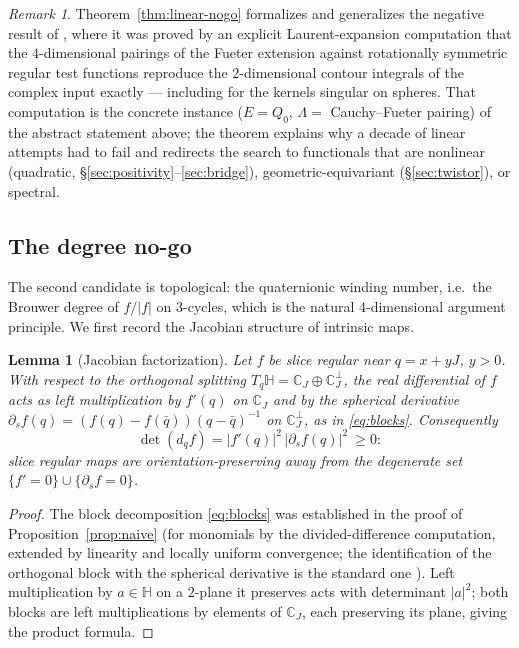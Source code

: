 \documentclass[11pt]{amsart}
\theoremstyle{plain}
\newtheorem{lemma}[theorem]{Lemma}
\theoremstyle{definition}
\theoremstyle{remark}
\newtheorem{remark}[theorem]{Remark}
\newcommand{\HH}{\mathbb{H}}
\newcommand{\CC}{\mathbb{C}}
\begin{document}
\begin{remark}\label{rem:nogo-history}
Theorem~\ref{thm:linear-nogo} formalizes and generalizes the negative result of
\cite[\S4]{Baker2015}, where it was proved by an explicit Laurent-expansion computation that the
$4$-dimensional pairings of the Fueter extension against rotationally symmetric regular test
functions reproduce the $2$-dimensional contour integrals of the complex input exactly ---
including for the kernels singular on spheres. That computation is the concrete instance
($E=Q_0$, $\Lambda=$ Cauchy--Fueter pairing) of the abstract statement above; the theorem explains
why a decade of linear attempts had to fail and redirects the search to functionals that are
nonlinear (quadratic, \S\ref{sec:positivity}--\ref{sec:bridge}), geometric-equivariant
(\S\ref{sec:twistor}), or spectral.
\end{remark}

\subsection{The degree no-go}

The second candidate is topological: the quaternionic winding number, i.e.\ the Brouwer degree of
$f/|f|$ on $3$-cycles, which is the natural $4$-dimensional argument principle. We first record
the Jacobian structure of intrinsic maps.

\begin{lemma}[Jacobian factorization]\label{lem:jacobian}
Let $f$ be slice regular near $q=x+yJ$, $y>0$. With respect to the orthogonal splitting
$T_q\HH=\CC_J\oplus\CC_J^\perp$, the real differential of $f$ acts as left multiplication by
$f'(q)$ on $\CC_J$ and by the spherical derivative $\partial_sf(q)=(f(q)-f(\bar q))(q-\bar q)^{-1}$
on $\CC_J^\perp$, as in \eqref{eq:blocks}. Consequently
\[
\det(d_qf)=|f'(q)|^2\,|\partial_sf(q)|^2\ \ge 0 :
\]
slice regular maps are orientation-preserving away from the degenerate set
$\{f'=0\}\cup\{\partial_sf=0\}$.
\end{lemma}

\begin{proof}
The block decomposition \eqref{eq:blocks} was established in the proof of
Proposition~\ref{prop:naive} (for monomials by the divided-difference computation, extended by
linearity and locally uniform convergence; the identification of the orthogonal block with the
spherical derivative is the standard one \cite{GhiloniPerotti2011,GSSbook}). Left multiplication
by $a\in\HH$ on a $2$-plane it preserves acts with determinant $|a|^2$; both blocks are left
multiplications by elements of $\CC_J$, each preserving its plane, giving the product formula.
\end{proof}
\end{document}
